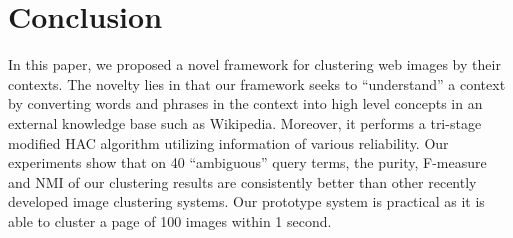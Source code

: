 \section{Conclusion}
\label{sec:conclude}
In this paper, we proposed a novel framework for clustering web images by 
their contexts. %
The novelty lies in that our framework seeks to ``understand'' 
a context by converting words
and phrases in the context into high level concepts in an external knowledge
base such as Wikipedia. Moreover, it performs a tri-stage modified HAC 
algorithm utilizing information of various reliability.
Our experiments show that on 40 ``ambiguous'' query terms, the purity, 
F-measure and NMI of our clustering results are
consistently better than other recently developed image clustering systems.
Our prototype system is practical as it is able to cluster a page of 
100 images within 1 second.
